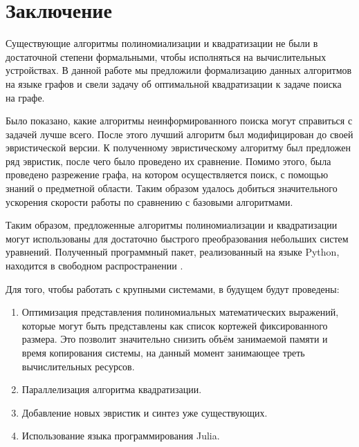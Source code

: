 
\section{Заключение}

Существующие алгоритмы полиномиализации и квадратизации не были в достаточной степени формальными, чтобы исполняться на вычислительных устройствах. В данной работе мы предложили формализацию данных алгоритмов на языке графов и свели задачу об оптимальной квадратизации к задаче поиска на графе.

Было показано, какие алгоритмы неинформированного поиска могут справиться с задачей лучше всего. После этого лучший алгоритм был модифицирован до своей эвристической версии. К полученному эвристическому алгоритму был предложен ряд эвристик, после чего было проведено их сравнение. Помимо этого, была проведено разрежение графа, на котором осуществляется поиск, с помощью знаний о предметной области. Таким образом удалось добиться значительного ускорения скорости работы по сравнению с базовыми алгоритмами.

Таким образом, предложенные алгоритмы полиномиализации и квадратизации могут использованы для достаточно быстрого преобразования небольших систем уравнений. Полученный программный пакет, реализованный на языке Python, находится в свободном распространении \cite{QBee}.

Для того, чтобы работать с крупными системами, в будущем будут проведены:
\begin{enumerate}
    \item Оптимизация представления полиномиальных математических выражений, которые могут быть представлены как список кортежей фиксированного размера. Это позволит значительно снизить объём занимаемой памяти и время копирования системы, на данный момент занимающее треть вычислительных ресурсов.
    \item Параллелизация алгоритма квадратизации.
    \item Добавление новых эвристик и синтез уже существующих.
    \item Использование языка программирования Julia. 
\end{enumerate}
